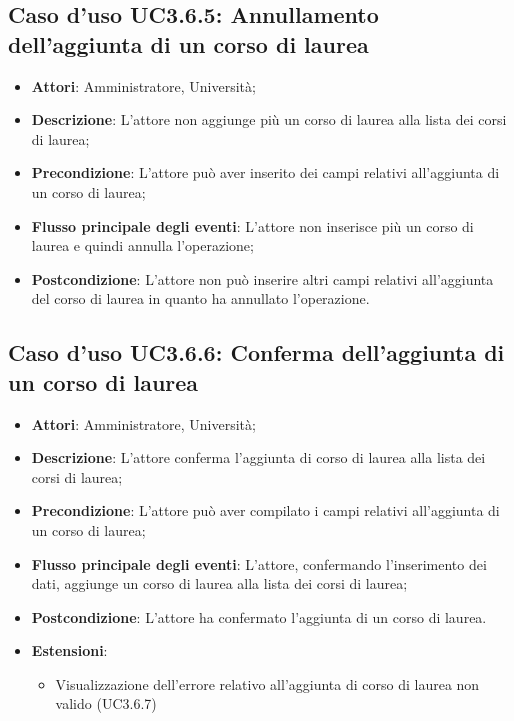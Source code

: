 \subsection{Caso d'uso \texorpdfstring{UC3.6.5}{UC3.6.5}: Annullamento dell'aggiunta di un corso di laurea}
\begin{itemize}
\item \textbf{Attori}: Amministratore, Università;
\item \textbf{Descrizione}: L'attore non aggiunge più un corso di laurea alla lista dei corsi di laurea;

\item \textbf{Precondizione}: L'attore può aver inserito dei campi relativi all'aggiunta di un corso di laurea;

\item \textbf{Flusso principale degli eventi}: L'attore non inserisce più un corso di laurea e quindi annulla l'operazione;

\item \textbf{Postcondizione}: L'attore non può inserire altri campi relativi all'aggiunta del corso di laurea in quanto ha annullato l'operazione.

\end{itemize}
\subsection{Caso d'uso \texorpdfstring{UC3.6.6}{UC3.6.6}: Conferma dell’aggiunta di un corso di laurea}
\begin{itemize}
\item \textbf{Attori}: Amministratore, Università;
\item \textbf{Descrizione}: L'attore conferma l'aggiunta di corso di laurea alla lista dei corsi di laurea;

\item \textbf{Precondizione}: L'attore può aver compilato i campi relativi all'aggiunta di un corso di laurea;

\item \textbf{Flusso principale degli eventi}: L'attore, confermando l'inserimento dei dati, aggiunge un corso di laurea alla lista dei corsi di laurea;

\item \textbf{Postcondizione}: L'attore ha confermato l'aggiunta di un corso di laurea.

\item \textbf{Estensioni}:
\begin{itemize}
\item Visualizzazione dell'errore relativo all’aggiunta di corso di laurea non valido  (UC3.6.7)
\end{itemize}
\end{itemize}
